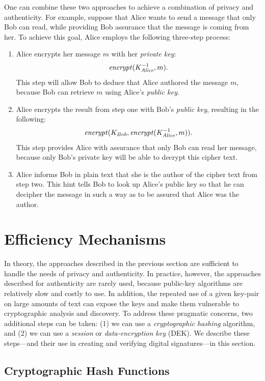 One can combine these
two approaches to achieve a combination of privacy
and authenticity.  For example, suppose that
Alice wants to send a message that only Bob can read, while providing
Bob assurance that the message is coming from her.  To achieve this
goal, Alice employs the following three-step process:
\begin{enumerate}
\item Alice encrypts her message $m$ with her \emph{private key}:
  \[ \mathit{encrypt}(K^{-1}_{\textit{Alice}},m). \] This step will allow
  Bob to deduce that Alice authored the message $m$, because Bob can
  retrieve $m$ using Alice's \emph{public key}.
\item Alice encrypts the result from step one with Bob's \emph{public
    key}, resulting in the following:
  \[
  \mathit{encrypt}(K_{\textit{Bob}},\mathit{encrypt}(K^{-1}_{\textit{Alice}},m)).
  \]
  This step provides Alice with assurance that only Bob can read her
  message, because only Bob's private key will be able to decrypt this
  cipher text.
\item Alice informs Bob in plain text that she is the author of the
  cipher text from step two.  This hint tells Bob to look up Alice's
  public key so that he can decipher the message in such a way as to be
  assured that Alice was the author.  
\end{enumerate}

\section{Efficiency Mechanisms}
\label{sec:digital-signatures}
In theory, the approaches described in the previous section are
sufficient to handle the needs of privacy and authenticity. In practice,
however, the approaches described for authenticity are rarely used,
because public-key algorithms are relatively slow and costly to use.  In
addition, the repeated use of a given key-pair on large amounts of text
can expose the keys and make them vulnerable to cryptographic analysis
and discovery. To address these pragmatic concerns, two additional steps
can be taken: (1) we can use a \emph{cryptographic hashing} algorithm,
and (2) we can use a \emph{session} or \emph{data-encryption key}
(DEK). We describe these steps---and their use in creating and verifying
digital signatures---in this section.

\subsection{Cryptographic Hash Functions}

